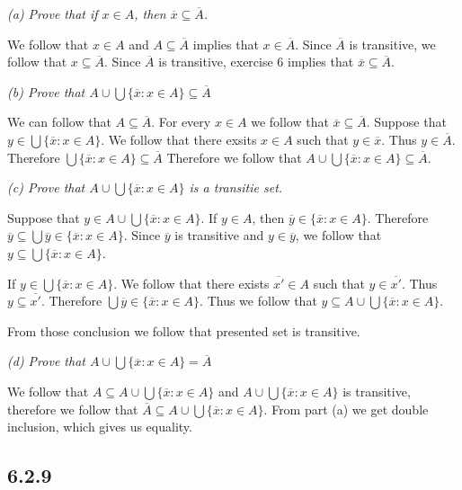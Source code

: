 \documentclass[11pt,oneside,titlepage]{book}
\begin{document}
\textit{(a) Prove that if $x \in A$, then $\overline{x} \subseteq \overline{A}$.}

We follow that $x \in A$ and $A \subseteq \overline{A}$ implies that
$x \in \overline{A}$. Since $\overline{A}$ is transitive, we follow that
$x \subseteq \overline{A}$. Since $\overline{A}$ is transitive, exercise 6 implies that
$\overline{x} \subseteq \overline{A}$.

\textit{(b) Prove that $A \cup \bigcup{\{\overline{x}: x \in A\}} \subseteq \overline{A}$}

We can follow that $A \subseteq \overline{A}$. For every $x \in A$ we follow that
$\overline{x} \subseteq \overline{A}$. Suppose that $y \in \bigcup{\{\overline{x}: x \in A\}}$.
We follow that there exsits $x \in A$ such that $y \in \overline{x}$. Thus
$y \in \overline{A}$. Therefore $\bigcup{\{\overline{x}: x \in A\}} \subseteq \overline{A}$
Therefore we follow that $A \cup \bigcup{\{\overline{x}: x \in A\}} \subseteq \overline{A}$.

\textit{(c) Prove that $A \cup \bigcup{\{\overline{x}: x \in A\}}$ is a transitie set.}

Suppose that $y \in A \cup \bigcup{\{\overline{x}: x \in A\}}$.
If $y \in A$, then $\overline{y} \in \{\overline{x}: x \in A\}$. Therefore
$\overline{y} \subseteq \bigcup{\overline{y} \in \{\overline{x}: x \in A\}}$.
Since $\overline{y}$ is transitive and $y \in \overline{y}$, we follow that
$y \subseteq \bigcup{\{\overline{x}: x \in A\}}$.

If $y \in \bigcup{\{\overline{x}: x \in A\}}$. We follow that
there exists $\overline{x'} \in A$ such that $y \in \overline{x'}$. Thus
$y \subseteq \overline{x'}$. Therefore $\bigcup{\overline{y} \in \{\overline{x}: x \in A\}}$.
Thus we follow that $y \subseteq  A \cup \bigcup{\{\overline{x}: x \in A\}}$.

From those conclusion we follow that presented set is transitive.

\textit{(d) Prove that $A \cup \bigcup{\{\overline{x}: x \in A\}} = \overline{A}$}

We follow that $A \subseteq A \cup \bigcup{\{\overline{x}: x \in A\}}$ and
$A \cup \bigcup{\{\overline{x}: x \in A\}}$ is transitive, therefore we follow that
$\overline{A} \subseteq A \cup \bigcup{\{\overline{x}: x \in A\}}$. From part
(a) we get double inclusion, which gives us equality.

\subsection*{6.2.9}
\end{document}
